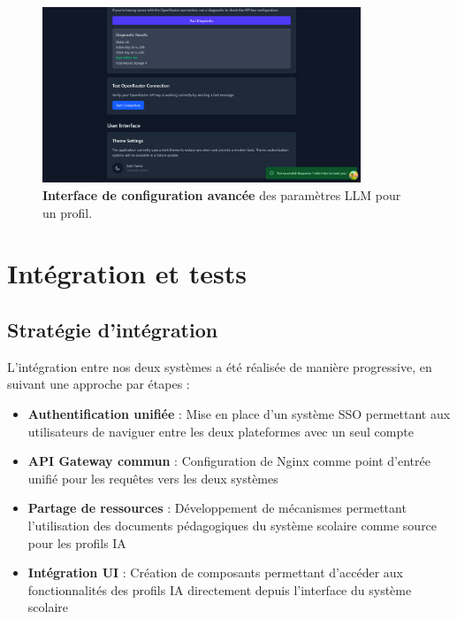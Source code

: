 \begin{figure}[H]
  \centering
  \includegraphics[width=0.85\textwidth,keepaspectratio]{pfe-pics/ai-profile-creation/Screenshot 2025-06-09 at 23-20-13 Vite React TS.png}
  \caption{\textbf{Interface de configuration avancée} des paramètres LLM pour un profil.}
  \label{fig:llm_config}
\end{figure}

\section{Intégration et tests}

\subsection{Stratégie d'intégration}

L'intégration entre nos deux systèmes a été réalisée de manière progressive, en suivant une approche par étapes :

\begin{itemize}
  \item \textbf{Authentification unifiée} : Mise en place d'un système SSO permettant aux utilisateurs de naviguer entre les deux plateformes avec un seul compte
  
  \item \textbf{API Gateway commun} : Configuration de Nginx comme point d'entrée unifié pour les requêtes vers les deux systèmes
  
  \item \textbf{Partage de ressources} : Développement de mécanismes permettant l'utilisation des documents pédagogiques du système scolaire comme source pour les profils IA
  
  \item \textbf{Intégration UI} : Création de composants permettant d'accéder aux fonctionnalités des profils IA directement depuis l'interface du système scolaire
\end{itemize}

